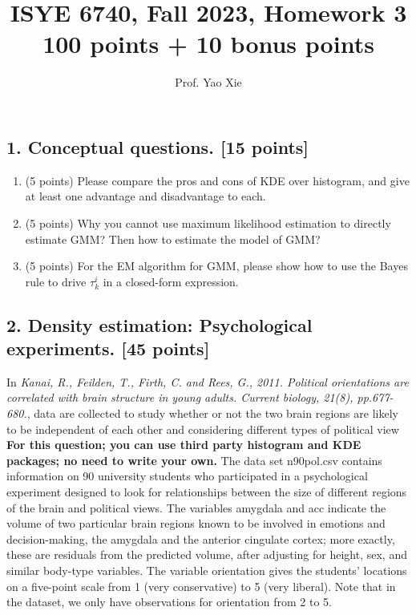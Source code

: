 \documentclass[12pt]{article}
\begin{document}
\title{ISYE 6740, Fall 2023, Homework 3\\{\small 100 points + 10 bonus points}}
\author{Prof. Yao Xie}
\date{}
\maketitle


\subsection*{1. Conceptual questions. [15 points]}


\begin{enumerate}



\item (5 points) Please compare the pros and cons of KDE over histogram, and give at least one advantage and disadvantage to each.

\item (5 points) Why you cannot use maximum likelihood estimation to directly estimate GMM? Then how to estimate the model of GMM?

\item (5 points) For the EM algorithm for GMM, please show how to use the Bayes rule to drive $\tau_k^i$ in a closed-form expression. 



\end{enumerate}


\subsection*{2. Density estimation: Psychological experiments. [45 points]}


In {\it Kanai, R., Feilden, T., Firth, C. and Rees, G., 2011. Political orientations are correlated with brain structure in young adults. Current biology, 21(8), pp.677-680.}, data are collected to  study whether or not the two brain regions are likely to be independent of each other and considering different types of political view \textbf{For this question; you can use third party histogram and KDE packages; no need to write your own.} The data set \textsf{n90pol.csv} contains information on 90 university students who participated in a psychological experiment designed to look for relationships between the size of different regions of the brain and political views. The variables \textsf{amygdala} and \textsf{acc} indicate the volume of two particular brain regions known to be involved in emotions and decision-making, the amygdala and the anterior cingulate cortex; more exactly, these are residuals from the predicted volume, after adjusting for height, sex, and similar body-type variables. The variable \textsf{orientation} gives the students' locations on a five-point scale from 1 (very conservative) to 5 (very liberal).  Note that in the dataset, we only have observations for orientation from 2 to 5. 
\end{document}
